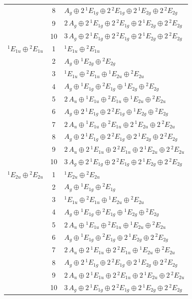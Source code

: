 \documentclass[11pt]{article}
\begin{document}
\begin{longtable}{l c p{}}
 & 8 & $A_{g}\oplus 2\,{}^{1}E_{1g}\oplus 2\,{}^{2}E_{1g}\oplus 2\,{}^{1}E_{2g}\oplus 2\,{}^{2}E_{2g}$\\
 & 9 & $2\,A_{g}\oplus 2\,{}^{1}E_{1g}\oplus 2\,{}^{2}E_{1g}\oplus 2\,{}^{1}E_{2g}\oplus 2\,{}^{2}E_{2g}$\\
 & 10 & $3\,A_{g}\oplus 2\,{}^{1}E_{1g}\oplus 2\,{}^{2}E_{1g}\oplus 2\,{}^{1}E_{2g}\oplus 2\,{}^{2}E_{2g}$\\
\hline
${}^{1}E_{1u}\oplus {}^{2}E_{1u}$ & 1 & ${}^{1}E_{1u}\oplus {}^{2}E_{1u}$\\
 & 2 & $A_{g}\oplus {}^{1}E_{2g}\oplus {}^{2}E_{2g}$\\
 & 3 & ${}^{1}E_{1u}\oplus {}^{2}E_{1u}\oplus {}^{1}E_{2u}\oplus {}^{2}E_{2u}$\\
 & 4 & $A_{g}\oplus {}^{1}E_{1g}\oplus {}^{2}E_{1g}\oplus {}^{1}E_{2g}\oplus {}^{2}E_{2g}$\\
 & 5 & $2\,A_{u}\oplus {}^{1}E_{1u}\oplus {}^{2}E_{1u}\oplus {}^{1}E_{2u}\oplus {}^{2}E_{2u}$\\
 & 6 & $A_{g}\oplus 2\,{}^{1}E_{1g}\oplus 2\,{}^{2}E_{1g}\oplus {}^{1}E_{2g}\oplus {}^{2}E_{2g}$\\
 & 7 & $2\,A_{u}\oplus {}^{1}E_{1u}\oplus {}^{2}E_{1u}\oplus 2\,{}^{1}E_{2u}\oplus 2\,{}^{2}E_{2u}$\\
 & 8 & $A_{g}\oplus 2\,{}^{1}E_{1g}\oplus 2\,{}^{2}E_{1g}\oplus 2\,{}^{1}E_{2g}\oplus 2\,{}^{2}E_{2g}$\\
 & 9 & $2\,A_{u}\oplus 2\,{}^{1}E_{1u}\oplus 2\,{}^{2}E_{1u}\oplus 2\,{}^{1}E_{2u}\oplus 2\,{}^{2}E_{2u}$\\
 & 10 & $3\,A_{g}\oplus 2\,{}^{1}E_{1g}\oplus 2\,{}^{2}E_{1g}\oplus 2\,{}^{1}E_{2g}\oplus 2\,{}^{2}E_{2g}$\\
\hline
${}^{1}E_{2u}\oplus {}^{2}E_{2u}$ & 1 & ${}^{1}E_{2u}\oplus {}^{2}E_{2u}$\\
 & 2 & $A_{g}\oplus {}^{1}E_{1g}\oplus {}^{2}E_{1g}$\\
 & 3 & ${}^{1}E_{1u}\oplus {}^{2}E_{1u}\oplus {}^{1}E_{2u}\oplus {}^{2}E_{2u}$\\
 & 4 & $A_{g}\oplus {}^{1}E_{1g}\oplus {}^{2}E_{1g}\oplus {}^{1}E_{2g}\oplus {}^{2}E_{2g}$\\
 & 5 & $2\,A_{u}\oplus {}^{1}E_{1u}\oplus {}^{2}E_{1u}\oplus {}^{1}E_{2u}\oplus {}^{2}E_{2u}$\\
 & 6 & $A_{g}\oplus {}^{1}E_{1g}\oplus {}^{2}E_{1g}\oplus 2\,{}^{1}E_{2g}\oplus 2\,{}^{2}E_{2g}$\\
 & 7 & $2\,A_{u}\oplus 2\,{}^{1}E_{1u}\oplus 2\,{}^{2}E_{1u}\oplus {}^{1}E_{2u}\oplus {}^{2}E_{2u}$\\
 & 8 & $A_{g}\oplus 2\,{}^{1}E_{1g}\oplus 2\,{}^{2}E_{1g}\oplus 2\,{}^{1}E_{2g}\oplus 2\,{}^{2}E_{2g}$\\
 & 9 & $2\,A_{u}\oplus 2\,{}^{1}E_{1u}\oplus 2\,{}^{2}E_{1u}\oplus 2\,{}^{1}E_{2u}\oplus 2\,{}^{2}E_{2u}$\\
 & 10 & $3\,A_{g}\oplus 2\,{}^{1}E_{1g}\oplus 2\,{}^{2}E_{1g}\oplus 2\,{}^{1}E_{2g}\oplus 2\,{}^{2}E_{2g}$\\
\hline
\end{longtable}
\end{document}
